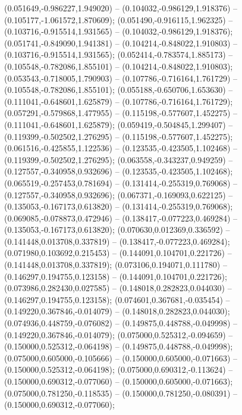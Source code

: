  (0.051649,-0.986227,1.949020) -- (0.104032,-0.986129,1.918376) -- (0.105177,-1.061572,1.870609);
 (0.051490,-0.916115,1.962325) -- (0.103716,-0.915514,1.931565) -- (0.104032,-0.986129,1.918376);
 (0.051741,-0.849090,1.941381) -- (0.104214,-0.848022,1.910803) -- (0.103716,-0.915514,1.931565);
 (0.052414,-0.783574,1.885173) -- (0.105548,-0.782086,1.855101) -- (0.104214,-0.848022,1.910803);
 (0.053543,-0.718005,1.790903) -- (0.107786,-0.716164,1.761729) -- (0.105548,-0.782086,1.855101);
 (0.055188,-0.650706,1.653630) -- (0.111041,-0.648601,1.625879) -- (0.107786,-0.716164,1.761729);
 (0.057291,-0.579868,1.477955) -- (0.115198,-0.577607,1.452275) -- (0.111041,-0.648601,1.625879);
 (0.059419,-0.504845,1.299407) -- (0.119399,-0.502502,1.276295) -- (0.115198,-0.577607,1.452275);
 (0.061516,-0.425855,1.122536) -- (0.123535,-0.423505,1.102468) -- (0.119399,-0.502502,1.276295);
 (0.063558,-0.343237,0.949259) -- (0.127557,-0.340958,0.932696) -- (0.123535,-0.423505,1.102468);
 (0.065519,-0.257453,0.781694) -- (0.131414,-0.255319,0.769068) -- (0.127557,-0.340958,0.932696);
 (0.067371,-0.169093,0.622125) -- (0.135053,-0.167173,0.613820) -- (0.131414,-0.255319,0.769068);
 (0.069085,-0.078873,0.472946) -- (0.138417,-0.077223,0.469284) -- (0.135053,-0.167173,0.613820);
 (0.070630,0.012369,0.336592) -- (0.141448,0.013708,0.337819) -- (0.138417,-0.077223,0.469284);
 (0.071980,0.103692,0.215453) -- (0.144091,0.104701,0.221726) -- (0.141448,0.013708,0.337819);
 (0.073106,0.194071,0.111780) -- (0.146297,0.194755,0.123158) -- (0.144091,0.104701,0.221726);
 (0.073986,0.282430,0.027585) -- (0.148018,0.282823,0.044030) -- (0.146297,0.194755,0.123158);
 (0.074601,0.367681,-0.035454) -- (0.149220,0.367846,-0.014079) -- (0.148018,0.282823,0.044030);
 (0.074936,0.448759,-0.076082) -- (0.149875,0.448788,-0.049998) -- (0.149220,0.367846,-0.014079);
 (0.075000,0.525312,-0.094659) -- (0.150000,0.525312,-0.064198) -- (0.149875,0.448788,-0.049998);
 (0.075000,0.605000,-0.105666) -- (0.150000,0.605000,-0.071663) -- (0.150000,0.525312,-0.064198);
 (0.075000,0.690312,-0.113624) -- (0.150000,0.690312,-0.077060) -- (0.150000,0.605000,-0.071663);
 (0.075000,0.781250,-0.118535) -- (0.150000,0.781250,-0.080391) -- (0.150000,0.690312,-0.077060);
